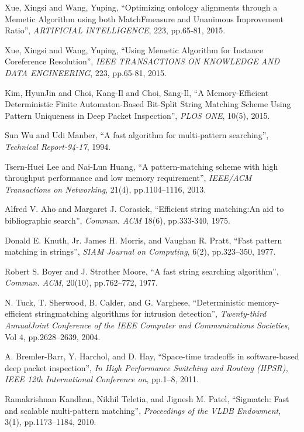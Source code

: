 \begin{thebibliography}{99}

 Xue, Xingsi and Wang, Yuping, ``Optimizing ontology
  alignments through a Memetic Algorithm using both MatchFmeasure and
  Unanimous Improvement Ratio'', {\it ARTIFICIAL INTELLIGENCE}, 223,
  pp.65-81, 2015.

 Xue, Xingsi and Wang, Yuping, ``Using Memetic
  Algorithm for Instance Coreference Resolution'', {\it IEEE
    TRANSACTIONS ON KNOWLEDGE AND DATA ENGINEERING}, 223, pp.65-81,
  2015.

 Kim, HyunJin and Choi, Kang-Il and Choi, Sang-Il,
  ``A Memory-Efficient Deterministic Finite Automaton-Based Bit-Split
  String Matching Scheme Using Pattern Uniqueness in Deep Packet
  Inspection'', {\it PLOS ONE}, 10(5), 2015.
  
 Sun Wu and Udi Manber, ``A fast algorithm for
  multi-pattern searching'', {\it Technical Report-94-17}, 1994.

 Tsern-Huei Lee and Nai-Lun Huang, ``A
  pattern-matching scheme with high throughput performance and low
  memory requirement'', {\it IEEE/ACM Transactions on Networking},
  21(4), pp.1104--1116, 2013.

 Alfred V. Aho and Margaret J. Corasick, ``Efficient
  string matching:An aid to bibliographic search'', {\it Commun. ACM}
  18(6), pp.333-340, 1975.

 Donald E. Knuth, Jr. James H. Morris, and Vaughan
  R. Pratt, ``Fast pattern matching in strings'', {\it SIAM Journal on
    Computing}, 6(2), pp.323–350, 1977.

 Robert S. Boyer and J. Strother Moore, ``A fast
  string searching algorithm'', {\it Commun. ACM}, 20(10), pp.762–772,
  1977.

 N. Tuck, T. Sherwood, B. Calder, and G. Varghese,
  ``Deterministic memory-efficient stringmatching algorithms for
  intrusion detection'', {\it Twenty-third AnnualJoint Conference of
    the IEEE Computer and Communications Societies}, Vol 4,
  pp.2628–2639, 2004.

 A. Bremler-Barr, Y. Harchol, and D. Hay,
  ``Space-time tradeoffs in software-based deep packet inspection'',
  {\it In High Performance Switching and Routing (HPSR), IEEE 12th
    International Conference on}, pp.1–8, 2011.

 Ramakrishnan Kandhan, Nikhil Teletia, and
  Jignesh M. Patel, ``Sigmatch: Fast and scalable multi-pattern
  matching'', {\it Proceedings of the VLDB Endowment}, 3(1),
  pp.1173–1184, 2010.


\end{thebibliography}
